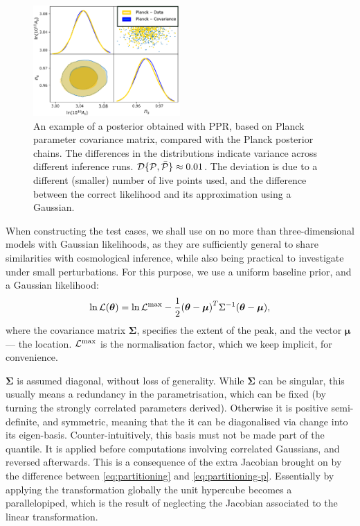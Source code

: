 \documentclass[usenatbib]{mnras}
\begin{document}
\begin{figure}
  \includegraphics[width=0.5\textwidth]{./illustrations/triangle-fit.pdf}
  \caption{An example of a posterior obtained with PPR, based on
    Planck parameter covariance matrix, compared with the Planck
    posterior chains. The differences in the distributions indicate
    variance across different inference runs.
    ${\cal D}\{ {\cal P}, \bar{\cal P}\} \approx 0.01$. The deviation
    is due to a different (smaller) number of live points used, and
    the difference between the correct likelihood and its
    approximation using a Gaussian. \label{fig:overlay-posteriors}}
\end{figure}


When constructing the test cases, we shall use on no more than
three-dimensional models with Gaussian likelihoods, as they are
sufficiently general to share similarities with cosmological
inference, while also being practical to investigate under small
perturbations.  For this purpose, we use a uniform baseline prior, and
a Gaussian likelihood:
\begin{equation}
  \ln {\cal L}(\bm{\theta}) = \ln {\cal L}^\text{max}- \dfrac{1}{2}{(\bm{\theta} - \bm{\mu})}^{T}\Sigma^{-1}(\bm{\theta}-\bm{\mu}),
\end{equation}
where the covariance matrix \(\bm{\Sigma}\), specifies the extent of
the peak, and the vector \(\bm{\mu}\) --- the location.
\({\cal L}^\text{max}\) is the normalisation factor, which we keep
implicit, for convenience.

$\bm{\Sigma}$ is assumed diagonal, without loss of generality. While
$\bm{\Sigma}$ can be singular, this usually means a redundancy in the
parametrisation, which can be fixed (by turning the strongly
correlated parameters derived). Otherwise it is positive
semi-definite, and symmetric, meaning that the it can be diagonalised
via change into its eigen-basis. Counter-intuitively, this basis must
not be made part of the quantile. It is applied before computations
involving correlated Gaussians, and reversed afterwards. This is a
consequence of the extra Jacobian brought on by the difference between
\cref{eq:partitioning} and \cref{eq:partitioning-p}. Essentially by
applying the transformation globally the unit hypercube becomes a
parallelopiped, which is the result of neglecting the Jacobian
associated to the linear transformation. 
\end{document}
